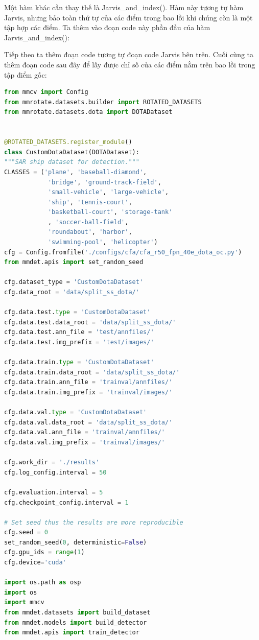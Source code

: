\documentclass[12pt,a4paper,openany,oneside]{report}
\begin{document}
Một hàm khác cần thay thế là Jarvis\_and\_index(). Hàm này tương tự hàm Jarvis, nhưng bảo toàn thứ tự của các điểm trong bao lồi khi chúng còn là một tập hợp các điểm. Ta thêm vào đoạn code này phần đầu của hàm Jarvis\_and\_index():

Tiếp theo ta thêm đoạn code tương tự đoạn code Jarvis bên trên. Cuối cùng ta thêm đoạn code sau đây để lấy được chỉ số của các điểm nằm trên bao lồi trong tập điểm gốc:


\begin{lstlisting}[language=python, caption={Câu lệnh để split ảnh trong tập dữ liệu DOTA},
	basicstyle=\fontsize{11}{13}\selectfont,
	keywordstyle=\bfseries,
	label={lst:command-line}]
from mmcv import Config
from mmrotate.datasets.builder import ROTATED_DATASETS
from mmrotate.datasets.dota import DOTADataset


@ROTATED_DATASETS.register_module()
class CustomDotaDataset(DOTADataset):
"""SAR ship dataset for detection."""
CLASSES = ('plane', 'baseball-diamond', 
			'bridge', 'ground-track-field',
			'small-vehicle', 'large-vehicle',
			'ship', 'tennis-court',
			'basketball-court', 'storage-tank'
			, 'soccer-ball-field',
			'roundabout', 'harbor',
			'swimming-pool', 'helicopter')
cfg = Config.fromfile('./configs/cfa/cfa_r50_fpn_40e_dota_oc.py')
from mmdet.apis import set_random_seed

cfg.dataset_type = 'CustomDotaDataset'
cfg.data_root = 'data/split_ss_dota/'

cfg.data.test.type = 'CustomDotaDataset'
cfg.data.test.data_root = 'data/split_ss_dota/'
cfg.data.test.ann_file = 'test/annfiles/'
cfg.data.test.img_prefix = 'test/images/'

cfg.data.train.type = 'CustomDotaDataset'
cfg.data.train.data_root = 'data/split_ss_dota/'
cfg.data.train.ann_file = 'trainval/annfiles/'
cfg.data.train.img_prefix = 'trainval/images/'

cfg.data.val.type = 'CustomDotaDataset'
cfg.data.val.data_root = 'data/split_ss_dota/'
cfg.data.val.ann_file = 'trainval/annfiles/'
cfg.data.val.img_prefix = 'trainval/images/'

cfg.work_dir = './results'
cfg.log_config.interval = 50

cfg.evaluation.interval = 5
cfg.checkpoint_config.interval = 1

# Set seed thus the results are more reproducible
cfg.seed = 0
set_random_seed(0, deterministic=False)
cfg.gpu_ids = range(1)
cfg.device='cuda'

import os.path as osp
import os
import mmcv
from mmdet.datasets import build_dataset
from mmdet.models import build_detector
from mmdet.apis import train_detector


\end{lstlisting}
\end{document}
